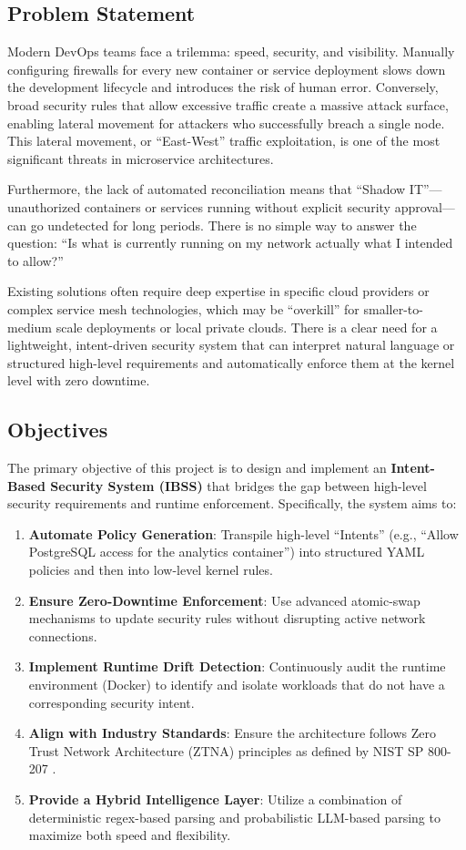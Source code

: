 \documentclass[12pt,a4paper]{article}
\begin{document}
\subsection{Problem Statement}
Modern DevOps teams face a trilemma: speed, security, and visibility. Manually configuring firewalls for every new container or service deployment slows down the development lifecycle and introduces the risk of human error. Conversely, broad security rules that allow excessive traffic create a massive attack surface, enabling lateral movement for attackers who successfully breach a single node. This lateral movement, or ``East-West'' traffic exploitation, is one of the most significant threats in microservice architectures.

Furthermore, the lack of automated reconciliation means that ``Shadow IT''—unauthorized containers or services running without explicit security approval—can go undetected for long periods. There is no simple way to answer the question: ``Is what is currently running on my network actually what I intended to allow?''

Existing solutions often require deep expertise in specific cloud providers or complex service mesh technologies, which may be ``overkill'' for smaller-to-medium scale deployments or local private clouds. There is a clear need for a lightweight, intent-driven security system that can interpret natural language or structured high-level requirements and automatically enforce them at the kernel level with zero downtime.

\subsection{Objectives}
The primary objective of this project is to design and implement an \textbf{Intent-Based Security System (IBSS)} that bridges the gap between high-level security requirements and runtime enforcement. Specifically, the system aims to:
\begin{enumerate}
    \item \textbf{Automate Policy Generation}: Transpile high-level ``Intents'' (e.g., ``Allow PostgreSQL access for the analytics container'') into structured YAML policies and then into low-level kernel rules.
    \item \textbf{Ensure Zero-Downtime Enforcement}: Use advanced atomic-swap mechanisms to update security rules without disrupting active network connections.
    \item \textbf{Implement Runtime Drift Detection}: Continuously audit the runtime environment (Docker) to identify and isolate workloads that do not have a corresponding security intent.
    \item \textbf{Align with Industry Standards}: Ensure the architecture follows Zero Trust Network Architecture (ZTNA) principles as defined by NIST SP 800-207 \cite{nist2020ztna}.
    \item \textbf{Provide a Hybrid Intelligence Layer}: Utilize a combination of deterministic regex-based parsing and probabilistic LLM-based parsing to maximize both speed and flexibility.
\end{enumerate}
\end{document}
